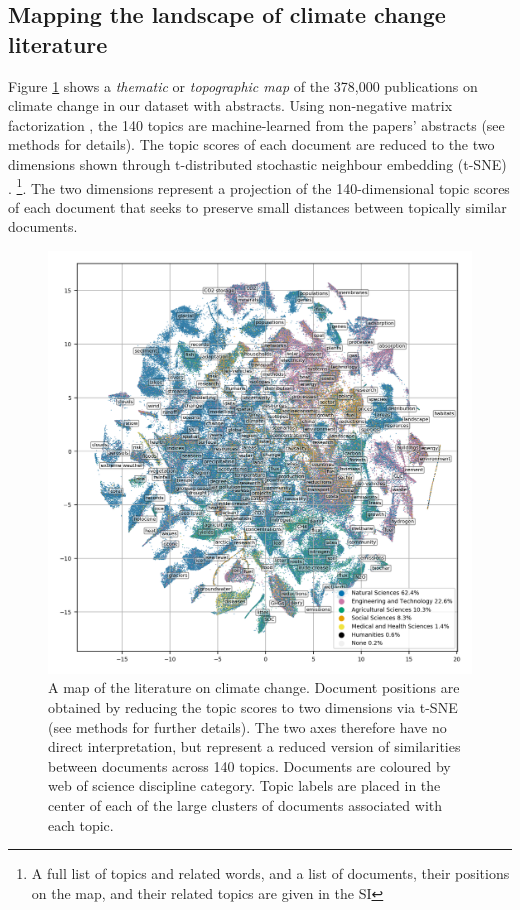 \documentclass{article}
\begin{document}
\begin{linenumbers}
		
		\subsection*{Mapping the landscape of climate change literature}
		
		Figure \ref{oecd_topic_map} shows a \emph{thematic} or \emph{topographic map} of the 378,000 publications on climate change in our dataset with abstracts. Using non-negative matrix factorization \cite{Lee1999}, the 140 topics are machine-learned from the papers' abstracts (see methods for details). The topic scores of each document are reduced to the two dimensions shown through t-distributed stochastic neighbour embedding (t-SNE) \cite{vandermaaten2008}. \footnote{A full list of topics and related words, and a list of documents, their positions on the map, and their related topics are given in the SI}. The two dimensions represent a projection of the 140-dimensional topic scores of each document that seeks to preserve small distances between topically similar documents.
		
		
		\begin{figure}[htp]
			\begin{center}
				\includegraphics[width=180mm]{../plots_pub/all_topic_words_oecds.png}
				\caption{A map of the literature on climate change. Document positions are obtained by reducing the topic scores to two dimensions via t-SNE (see methods for further details). The two axes therefore have no direct interpretation, but represent a reduced version of similarities between documents across 140 topics. Documents are coloured by web of science discipline category. Topic labels are placed in the center of each of the large clusters of documents associated with each topic. }
				\label{oecd_topic_map}
			\end{center}
		\end{figure}
		

\end{linenumbers}
\end{document}
